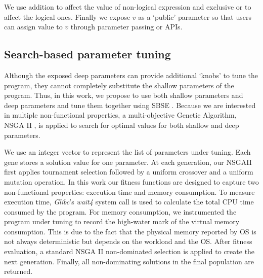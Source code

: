 We use addition to affect the value of non-logical expression and exclusive or to affect the logical ones.
Finally we expose $v$ as a `public' parameter so that users can assign value to $v$ through parameter passing or APIs.

\subsection{Search-based parameter tuning}
\label{sec_nsgaii}

Although the exposed deep parameters can provide additional `knobs' \cite{Hoffmann:2011:DKR:1961296.1950390} to tune the program, they cannot completely substitute the shallow parameters of the program.  Thus, in this work, we propose to use both shallow parameters and deep parameters and tune them together using SBSE \cite{Harman:2007:CSF:1253532.1254729}. Because we are interested in multiple non-functional properties, a multi-objective Genetic Algorithm, NSGA II \cite{996017}, is applied to search for optimal values for both shallow and deep parameters.


We use an integer vector to represent the list of parameters under tuning. Each gene stores a solution value for one parameter. At each generation, our NSGAII first applies tournament selection followed by a uniform crossover and a uniform mutation operation. In this work our fitness functions are designed to capture two non-functional properties: execution time and memory consumption. To measure execution time, \emph{Glibc}'s \emph{wait4} system call is used to calculate the total CPU time consumed by the program. For memory consumption, we instrumented the program under tuning to record the high-water mark of the virtual memory consumption. This is due to the fact that the physical memory reported by OS is not always deterministic but depends on the workload and the OS. After fitness evaluation, a standard NSGA II non-dominated selection is applied to create the next generation. Finally, all non-dominating solutions in the final population are returned.
